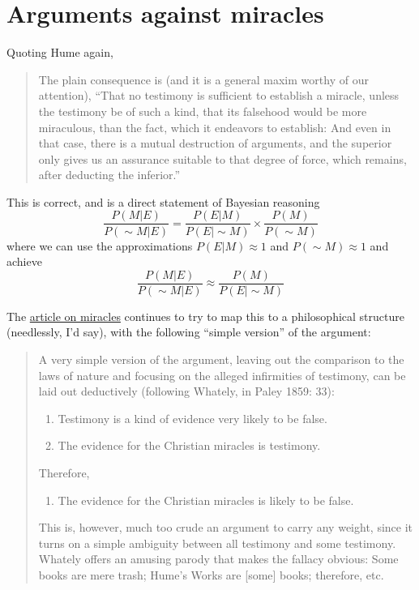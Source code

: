 \section{Arguments against miracles}\label{arguments-against-miracles}

Quoting Hume again,

\begin{quote}
The plain consequence is (and it is a general maxim worthy of our
attention), ``That no testimony is sufficient to establish a miracle,
unless the testimony be of such a kind, that its falsehood would be more
miraculous, than the fact, which it endeavors to establish: And even in
that case, there is a mutual destruction of arguments, and the superior
only gives us an assurance suitable to that degree of force, which
remains, after deducting the inferior.''
\end{quote}

This is correct, and is a direct statement of Bayesian reasoning \[
\frac{P(M|E)}{P(\sim\!M|E)} =\frac{P(E|M)}{P(E|\sim\!M)} \times\frac{P(M)}{P(\sim\!M)}
\] where we can use the approximations \(P(E|M)\approx 1\) and
\(P(\sim\!M)\approx 1\) and achieve \[
\frac{P(M|E)}{P(\sim\!M|E)} \approx \frac{P(M)}{P(E|\sim\!M)}
\]

The \href{http://plato.stanford.edu/entries/miracles/}{article on
miracles} continues to try to map this to a philosophical structure
(needlessly, I'd say), with the following ``simple version'' of the
argument:

\begin{quote}
A very simple version of the argument, leaving out the comparison to the
laws of nature and focusing on the alleged infirmities of testimony, can
be laid out deductively (following Whately, in Paley 1859: 33):

\begin{enumerate}
\def\labelenumi{\arabic{enumi})}
\item
  Testimony is a kind of evidence very likely to be false.
\item
  The evidence for the Christian miracles is testimony.
\end{enumerate}

Therefore,

\begin{enumerate}
\def\labelenumi{\arabic{enumi})}
\setcounter{enumi}{2}
\itemsep1pt\parskip0pt
\item
  The evidence for the Christian miracles is likely to be false.
\end{enumerate}

This is, however, much too crude an argument to carry any weight, since
it turns on a simple ambiguity between all testimony and some testimony.
Whately offers an amusing parody that makes the fallacy obvious: Some
books are mere trash; Hume's Works are {[}some{]} books; therefore, etc.
\end{quote}

